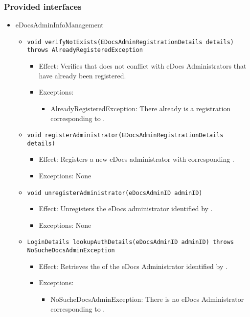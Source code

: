 \subsubsection*{Provided interfaces}
\begin{itemize}
    \item eDocsAdminInfoManagement
    \begin{itemize}
        \item \texttt{void verifyNotExists(EDocsAdminRegistrationDetails details) throws AlreadyRegisteredException}
        \begin{itemize}
            \item Effect: Verifies that  does not conflict with eDocs Administrators that have already been registered.
            \item Exceptions:
			\begin{itemize}
				\item AlreadyRegisteredException: There already is a registration corresponding to .
			\end{itemize}
        \end{itemize}

        \item \texttt{void registerAdministrator(EDocsAdminRegistrationDetails details)}
        \begin{itemize}
            \item Effect: Registers a new eDocs administrator with corresponding .
            \item Exceptions: None
        \end{itemize}

		\item \texttt{void unregisterAdministrator(eDocsAdminID adminID)}
        \begin{itemize}
            \item Effect: Unregisters the eDocs administrator identified by .
            \item Exceptions: None
        \end{itemize}

		\item \texttt{LoginDetails lookupAuthDetails(eDocsAdminID adminID) throws NoSucheDocsAdminException}
		    \begin{itemize}
                \item Effect: Retrieves the  of the eDocs Administrator identified by .
                \item Exceptions:
				\begin{itemize}
					\item NoSucheDocsAdminException: There is no eDocs Administrator corresponding to .
				\end{itemize}
            \end{itemize}
    \end{itemize}
\end{itemize}

